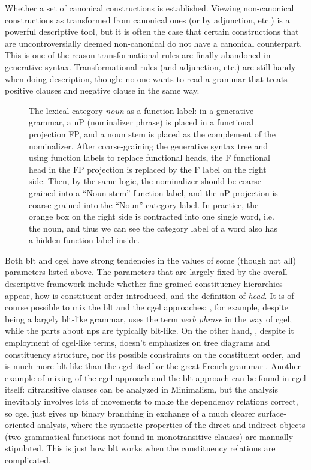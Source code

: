 \documentclass[UTF8, a4paper, oneside, scheme=plain]{ctexart}
\newcommand*{\term}[1]{\emph{#1}}
\begin{document}
Whether a set of canonical constructions is established.
Viewing non-canonical constructions as transformed from canonical ones (or by adjunction, etc.) 
is a powerful descriptive tool,
but it is often the case that certain constructions 
that are uncontroversially deemed non-canonical do not have a canonical counterpart.
This is one of the reason transformational rules are finally abandoned in generative syntax.
Transformational rules (and adjunction, etc.) are still handy when doing description, though:
no one wants to read a grammar that treats positive clauses and negative clause in the same way.

\begin{figure}
    \centering
    
    \caption{The lexical category \term{noun} as a function label:
    in a generative grammar, a nP (nominalizer phrase) is placed in a functional projection FP,
    and a noun stem is placed as the complement of the nominalizer.
    After coarse-graining the generative syntax tree 
    and using function labels to replace functional heads,
    the F functional head in the FP projection is replaced by the F label on the right side.
    Then, by the same logic, 
    the nominalizer should be coarse-grained into a ``Noun-stem'' function label,
    and the nP projection is coarse-grained into the ``Noun'' category label.
    In practice, the orange box on the right side
    is contracted into one single word, i.e. the noun,
    and thus we can see the category label of a word also has a hidden function label inside.}
    \label{fig:noun-function}
\end{figure}

Both \ac{blt} and \ac{cgel} 
have strong tendencies in the values of some (though not all) parameters listed above.
The parameters that are largely fixed by the overall descriptive framework 
include whether fine-grained constituency hierarchies appear,
how is constituent order introduced,
and the definition of \term{head}.
It is of course possible to mix the \ac{blt} and the \ac{cgel} approaches:
\citet{Friesen2017}, for example, despite being a largely \ac{blt}-like grammar,
uses the term \term{verb phrase} in the way of \ac{cgel},
while the parts about \ac{np}s are typically \ac{blt}-like.
On the other hand, \citet{munoz2000gramatica2}, 
despite it employment of \ac{cgel}-like terms,
doesn't emphasizes on tree diagrams and 
constituency structure, nor its possible constraints on the constituent order,
and is much more \ac{blt}-like than the \ac{cgel} itself or the great French grammar \citep{abeille2021grande}.
Another example of mixing of the \ac{cgel} approach and the \ac{blt} approach
can be found in \ac{cgel} itself:
ditransitive clauses can be analyzed in Minimalism,
but the analysis inevitably involves lots of movements
to make the dependency relations correct,
so \ac{cgel} just gives up binary branching in exchange of a much clearer surface-oriented analysis,
where the syntactic properties of the direct and indirect objects 
(two grammatical functions not found in monotransitive clauses)
are manually stipulated.
This is just how \ac{blt} works when the constituency relations are complicated.
\end{document}
